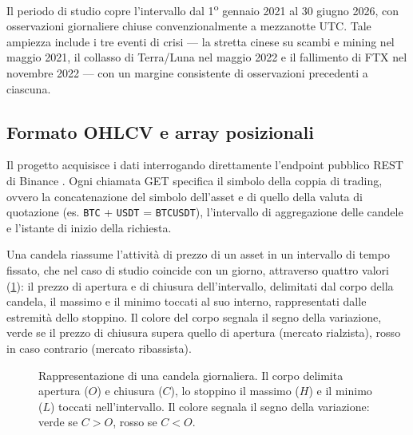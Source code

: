 Il periodo di studio copre l'intervallo dal 1\textsuperscript{o} gennaio 2021 al 30 giugno 2026, con osservazioni giornaliere chiuse convenzionalmente a mezzanotte UTC. Tale ampiezza include i tre eventi di crisi — la stretta cinese su scambi e mining nel maggio 2021, il collasso di Terra/Luna nel maggio 2022 e il fallimento di FTX nel novembre 2022 — con un margine consistente di osservazioni precedenti a ciascuna.

\subsection{Formato OHLCV e array posizionali}
\label{sec:ohlcv-positional-arrays}

Il progetto acquisisce i dati interrogando direttamente l'endpoint pubblico REST di Binance . Ogni chiamata GET specifica il simbolo della coppia di trading, ovvero la concatenazione del simbolo dell'asset e di quello della valuta di quotazione (es. \texttt{BTC} + \texttt{USDT} = \texttt{BTCUSDT}), l'intervallo di aggregazione delle candele e l'istante di inizio della richiesta.

Una candela riassume l'attività di prezzo di un asset in un intervallo di tempo fissato, che nel caso di studio coincide con un giorno, attraverso quattro valori (\cref{fig:candlestick}): il prezzo di apertura e di chiusura dell'intervallo, delimitati dal corpo della candela, il massimo e il minimo toccati al suo interno, rappresentati dalle estremità dello stoppino. Il colore del corpo segnala il segno della variazione, verde se il prezzo di chiusura supera quello di apertura (mercato rialzista), rosso in caso contrario (mercato ribassista).

\begin{figure}[H]
\centering
{}
\caption[Candela OHLC]{Rappresentazione di una candela giornaliera. Il corpo delimita apertura ($O$) e chiusura ($C$), lo stoppino il massimo ($H$) e il minimo ($L$) toccati nell'intervallo. Il colore segnala il segno della variazione: verde se $C>O$, rosso se $C<O$.}
\label{fig:candlestick}
\end{figure}

